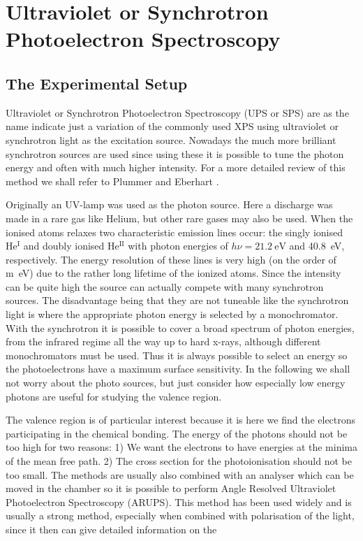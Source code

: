\chapter{Ultraviolet or Synchrotron Photoelectron Spectroscopy}
\section{The Experimental Setup}
Ultraviolet or Synchrotron  Photoelectron Spectroscopy (UPS or SPS)  are as the name indicate just a variation of the commonly used XPS using ultraviolet or synchrotron light as the excitation source. Nowadays the much more brilliant synchrotron sources are used since using these it is possible to tune the  photon energy and often with much higher intensity.  For a more detailed review of this method we shall refer to Plummer and Eberhart \cite{Plummer}.

Originally an UV-lamp was used as the photon source. Here a discharge was made in a rare gas like Helium, but other rare gases may also be used. When the ionised atoms relaxes two characteristic emission lines occur: the singly ionised He$^{\mathrm{I}}$  and doubly ionised He$^{\mathrm{II}}$ with photon energies of  $h\nu=\SI{21.2}{\electronvolt}$ and \SI{40.8}{\electronvolt}, respectively. The energy resolution of these lines is very high (on the order of \si{m\electronvolt}) due to the rather long lifetime of the ionized atoms. Since the intensity can be quite high the source can actually compete with many synchrotron sources. The disadvantage being that they are not tuneable like the synchrotron light is where the appropriate photon energy is selected by a monochromator. With the synchrotron it is possible to cover a broad spectrum of  photon energies, from the infrared regime all the way up to hard x-rays, although different monochromators must be used.  Thus it is always possible to select an energy so the photoelectrons have a maximum surface sensitivity. In the following we shall not worry about the photo sources, but just consider how especially low energy photons are useful for studying the valence region.

The valence region is of particular interest because it is here we find the electrons participating in the chemical bonding. The energy of the photons should not be too high for two reasons: 1) We want the electrons to have energies at the minima of the mean free path. 2) The cross section for the photoionisation should not be too small. The methods are usually also combined with an analyser which can be moved in the chamber so it is possible to perform Angle Resolved Ultraviolet Photoelectron Spectroscopy (ARUPS). This method has been used widely and is usually a strong method, especially when combined with polarisation of the light, since it then can give detailed information on the

